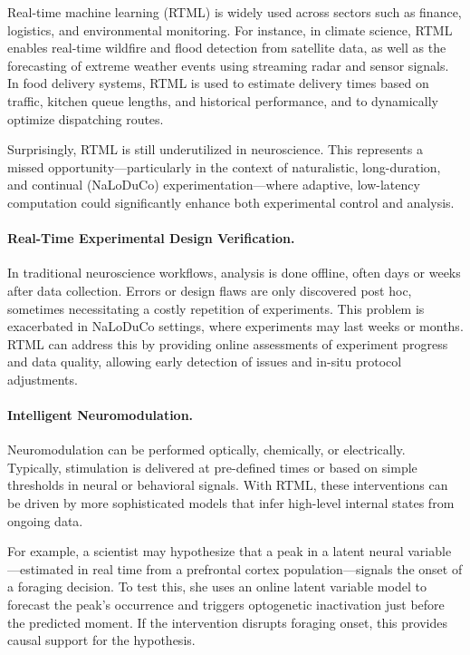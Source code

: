 
Real-time machine learning (RTML) is widely used across sectors such as finance, logistics, and environmental monitoring.
%
For instance, in climate science, RTML enables real-time wildfire and flood detection from satellite data, as well as the forecasting of extreme weather events using streaming radar and sensor signals.
%
In food delivery systems, RTML is used to estimate delivery times based on traffic, kitchen queue lengths, and historical performance, and to dynamically optimize dispatching routes.

Surprisingly, RTML is still underutilized in neuroscience.
%
This represents a missed opportunity—particularly in the context of naturalistic, long-duration, and continual (NaLoDuCo) experimentation—where adaptive, low-latency computation could significantly enhance both experimental control and analysis.

\paragraph{Real-Time Experimental Design Verification.}
In traditional neuroscience workflows, analysis is done offline, often days or weeks after data collection.
%
Errors or design flaws are only discovered post hoc, sometimes necessitating a costly repetition of experiments.
%
This problem is exacerbated in NaLoDuCo settings, where experiments may last weeks or months.
%
RTML can address this by providing online assessments of experiment progress and data quality, allowing early detection of issues and in-situ protocol adjustments.

\paragraph{Intelligent Neuromodulation.}
Neuromodulation can be performed optically, chemically, or electrically.
%
Typically, stimulation is delivered at pre-defined times or based on simple thresholds in neural or behavioral signals.
%
With RTML, these interventions can be driven by more sophisticated models that infer high-level internal states from ongoing data.

%
For example, a scientist may hypothesize that a peak in a latent neural variable—estimated in real time from a prefrontal cortex population—signals the onset of a foraging decision.
%
To test this, she uses an online latent variable model to forecast the peak's occurrence and triggers optogenetic inactivation just before the predicted moment.
%
If the intervention disrupts foraging onset, this provides causal support for the hypothesis.

